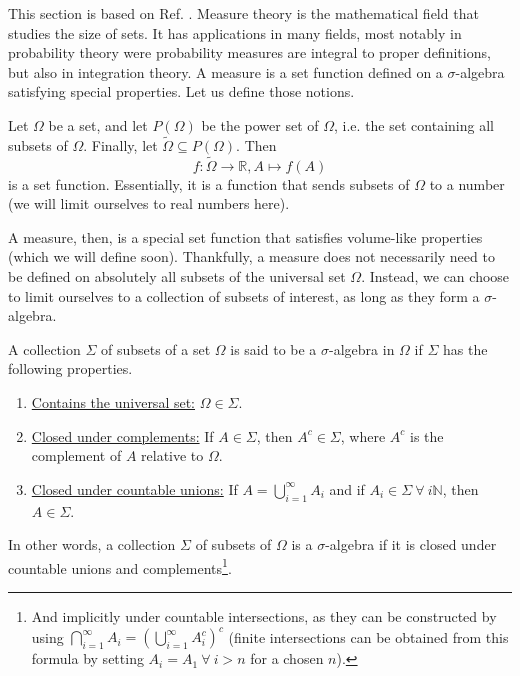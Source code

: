 \setcounter{equation}{0}

This section is based on Ref. \cite[pp. 8--16]{rudin_real_1987}. Measure theory is the mathematical field that studies the size of sets. It has applications in many fields, most notably in probability theory were probability measures are integral to proper definitions, but also in integration theory. A measure is a set function defined on a $\sigma$-algebra satisfying special properties. Let us define those notions.

\begin{appendix_definition} \label{def:set_function}
    Let $\Omega$ be a set, and let $P(\Omega)$ be the power set of $\Omega$, i.e. the set containing all subsets of $\Omega$. Finally, let $\tilde{\Omega} \subseteq P(\Omega)$. Then
    \begin{equation}
        f: \tilde{\Omega} \rightarrow \mathbb{R}, A \mapsto f(A)
    \end{equation}
    is a set function. Essentially, it is a function that sends subsets of $\Omega$ to a number (we will limit ourselves to real numbers here).
\end{appendix_definition}

A measure, then, is a special set function that satisfies volume-like properties (which we will define soon). Thankfully, a measure does not necessarily need to be defined on absolutely all subsets of the universal set $\Omega$. Instead, we can choose to limit ourselves to a collection of subsets of interest, as long as they form a $\sigma$-algebra.

\begin{appendix_definition} \label{def:sigma_algebra}
    A collection $\Sigma$ of subsets of a set $\Omega$ is said to be a $\sigma$-algebra in $\Omega$ if $\Sigma$ has the following properties.
    \begin{enumerate}
        \item \underline{Contains the universal set:} $\Omega \in \Sigma$.
        \item \underline{Closed under complements:} If $A \in \Sigma$, then $A^c \in \Sigma$, where $A^c$ is the complement of $A$ relative to $\Omega$.
        \item \underline{Closed under countable unions:} If $A = \bigcup\limits_{i = 1}^\infty A_i$ and if $A_i \in \Sigma \: \forall \: i \mathbb{N}$, then $A \in \Sigma$.
    \end{enumerate}
    In other words, a collection $\Sigma$ of subsets of $\Omega$ is a $\sigma$-algebra if it is closed under countable unions and complements\footnote{And implicitly under countable intersections, as they can be constructed by using $\bigcap\limits_{i = 1}^\infty A_i = \left(\bigcup\limits_{i = 1}^\infty A_i^c\right)^c$ (finite intersections can be obtained from this formula by setting $A_i = A_1 \: \forall \: i > n$ for a chosen $n$).}.
\end{appendix_definition}

